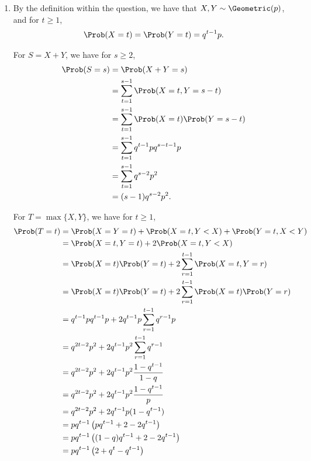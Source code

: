 \Question{\currfilebase}
\begin{enumerate}
    \item By the definition within the question, we have that \(X, Y \sim \Geometric(p)\), and for \(t \geq 1\),
          \begin{align*}
              \Prob(X = t) = \Prob(Y = t) = q^{t - 1} p.
          \end{align*}

          For \(S = X + Y\), we have for \(s \geq 2\),
          \begin{align*}
              \Prob(S = s) & = \Prob(X + Y = s)                                   \\
                           & = \sum_{t = 1}^{s - 1} \Prob(X = t, Y = s - t)       \\
                           & = \sum_{t = 1}^{s - 1} \Prob(X = t) \Prob(Y = s - t) \\
                           & = \sum_{t = 1}^{s - 1} q^{t - 1} p q^{s - t - 1} p   \\
                           & = \sum_{t = 1}^{s - 1} q^{s - 2} p^2                 \\
                           & = (s - 1) q^{s - 2} p^2.
          \end{align*}

          For \(T = \max\{X, Y\}\), we have for \(t \geq 1\),
          \begin{align*}
              \Prob(T = t) & = \Prob(X = Y = t) + \Prob(X = t, Y < X) + \Prob(Y = t, X < Y)                 \\
                           & = \Prob(X = t, Y = t) + 2 \Prob(X = t, Y < X)                                  \\
                           & = \Prob(X = t) \Prob(Y = t) + 2 \sum_{r = 1}^{t - 1} \Prob(X = t, Y = r)       \\
                           & = \Prob(X = t) \Prob(Y = t) + 2 \sum_{r = 1}^{t - 1} \Prob(X = t) \Prob(Y = r) \\
                           & = q^{t - 1} p q^{t - 1}p + 2 q^{t - 1} p \sum_{r = 1}^{t - 1} q^{r - 1} p      \\
                           & = q^{2t - 2} p^2 + 2 q^{t - 1} p^2 \sum_{r = 1}^{t - 1} q^{r - 1}              \\
                           & = q^{2t - 2} p^2 + 2 q^{t - 1} p^2 \frac{1 - q^{t - 1}}{1 - q}                 \\
                           & = q^{2t - 2} p^2 + 2 q^{t - 1} p^2 \frac{1 - q^{t - 1}}{p}                     \\
                           & = q^{2t - 2} p^2 + 2 q^{t - 1} p (1 - q^{t - 1})                               \\
                           & = pq^{t - 1} \left(pq^{t - 1} + 2 - 2q^{t - 1}\right)                          \\
                           & = pq^{t - 1} \left((1 - q)q^{t - 1} + 2 - 2q^{t - 1}\right)                    \\
                           & = pq^{t - 1} \left(2 + q^t - q^{t - 1}\right)
          \end{align*}


\end{enumerate}
